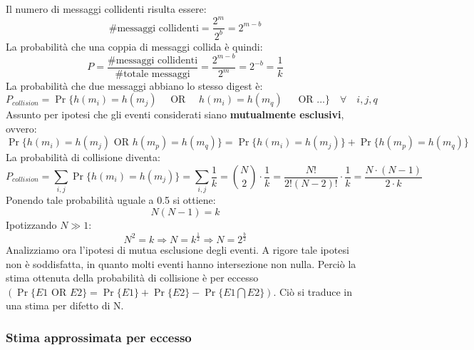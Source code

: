 Il numero di messaggi collidenti risulta essere:
\[
\text{\#messaggi collidenti} = \frac{2^{m}}{2^b} = 2^{m-b}
\]
La probabilità che una coppia di messaggi collida è quindi:
\[
P = \frac{\text{\#messaggi collidenti}}{\text{\#totale messaggi}} = \frac{2^{m-b}}{2^m} = 2^{-b} = \frac{1}{k}
\]
La probabilità che due messaggi abbiano lo stesso digest è:
\begin{equation}
P_{collision} = \Pr\{h(m_i) = h(m_j) \quad \mbox{ OR } \quad h(m_i) = h(m_q)\ \quad \mbox{ OR } ... \}  \quad \forall \quad i,j,q
\end{equation}
Assunto per ipotesi che gli eventi considerati siano \textbf{mutualmente esclusivi}, ovvero:
\begin{equation}
\Pr\{h(m_i) = h(m_j) \mbox{ OR } h(m_p) = h(m_q)\} = \Pr\{h(m_i) = h(m_j)\} + \Pr\{ h(m_p) = h(m_q)\}
\end{equation}
La probabilità di collisione diventa:
\begin{equation}
P_{collision} = \sum\limits_{i,j} \Pr\{h(m_i) = h(m_j)\} = \sum\limits_{i,j} \frac{1}{k} =  \binom {N}{2} \cdot \frac{1}{k} = \frac{N!}{2!(N - 2)!} \cdot \frac{1}{k} = \frac{N \cdot (N-1)}{2 \cdot k}
\end{equation}
Ponendo tale probabilità uguale a 0.5 si ottiene:
\begin{equation}
N(N - 1) = k
\end{equation}
Ipotizzando $N \gg 1$:
\begin{equation}
N^2 = k \Rightarrow N = k^{\frac{1}{2}} \Rightarrow N = 2^{\frac{b}{2}}
\end{equation}
Analizziamo ora l'ipotesi di mutua esclusione degli eventi. A rigore tale ipotesi non è soddisfatta, in quanto molti eventi hanno intersezione non nulla. Perciò la stima ottenuta della probabilità di collisione è per eccesso $(\Pr\{E1 \mbox{ OR } E2\} = \Pr\{E1\} + \Pr\{E2\} - \Pr\{E1 \bigcap E2\})$. Ciò si traduce in una stima per difetto di N. \newline \newline

\subsubsection{Stima approssimata per eccesso}

